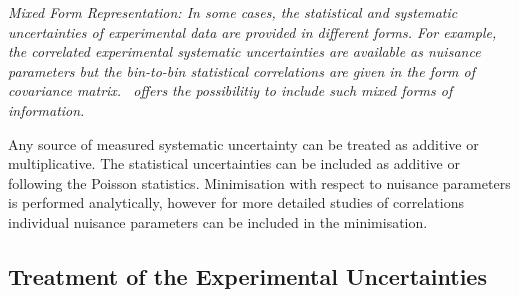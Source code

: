 \begin{description}
\item  \it{Mixed Form Representation:} \rm
In some cases, the statistical and systematic uncertainties of experimental data are provided in different forms.    
For example, the correlated experimental systematic uncertainties are available as nuisance parameters
but the bin-to-bin statistical correlations are given in the form of covariance matrix.
\fitter\ offers the possibilitiy to include such mixed forms of information. 
\end{description}
Any source of measured systematic uncertainty can be treated as additive or multiplicative. 
The statistical uncertainties can be included as additive or following the Poisson statistics. Minimisation
with respect to nuisance parameters is performed analytically, however for more 
detailed studies of correlations individual nuisance parameters can be included in 
the \minuit minimisation.


\subsection{Treatment of the Experimental Uncertainties}
\label{sec:experimentalerrors}


